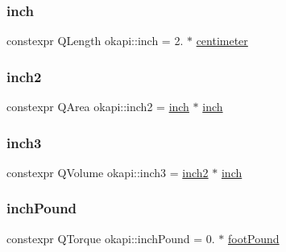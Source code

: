 \mbox{\label{namespaceokapi_a7da6f1f2fa46ec3694ba3f5361bcba80}} 
\subsubsection{\texorpdfstring{inch}{inch}}
{\footnotesize\ttfamily constexpr Q\+Length okapi\+::inch = 2. $\ast$ \mbox{\hyperlink{namespaceokapi_a889129a4ecb3e93c695c8eea53b96602}{centimeter}}}

\mbox{\label{namespaceokapi_ac232406bb408f51239ae71a3bd566a12}} 
\subsubsection{\texorpdfstring{inch2}{inch2}}
{\footnotesize\ttfamily constexpr Q\+Area okapi\+::inch2 = \mbox{\hyperlink{namespaceokapi_a7da6f1f2fa46ec3694ba3f5361bcba80}{inch}} $\ast$ \mbox{\hyperlink{namespaceokapi_a7da6f1f2fa46ec3694ba3f5361bcba80}{inch}}}

\mbox{\label{namespaceokapi_ae97077d294f94936fa0261a15d7e8b9e}} 
\subsubsection{\texorpdfstring{inch3}{inch3}}
{\footnotesize\ttfamily constexpr Q\+Volume okapi\+::inch3 = \mbox{\hyperlink{namespaceokapi_ac232406bb408f51239ae71a3bd566a12}{inch2}} $\ast$ \mbox{\hyperlink{namespaceokapi_a7da6f1f2fa46ec3694ba3f5361bcba80}{inch}}}

\mbox{\label{namespaceokapi_adbb0e6b3b23a41f9e8b971a0af1105fc}} 
\subsubsection{\texorpdfstring{inchPound}{inchPound}}
{\footnotesize\ttfamily constexpr Q\+Torque okapi\+::inch\+Pound = 0. $\ast$ \mbox{\hyperlink{namespaceokapi_a2312145f0a7f17b0a275289bfd369308}{foot\+Pound}}}

\mbox{\label{namespaceokapi_a4d717f5c9e81628ef90348718c925d16}} 
